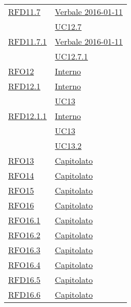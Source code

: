 \begin{longtable}{|>{\centering}m{5cm}|m{5cm}<{\centering}|}
\hyperlink{RFD11.7}{RFD11.7} & \hyperlink{Verbale 2016-01-11}{Verbale 2016-01-11}\\
& \hyperref[UC12.7]{UC12.7}\\ \hline

\hyperlink{RFD11.7.1}{RFD11.7.1} & \hyperlink{Verbale 2016-01-11}{Verbale 2016-01-11}\\
& \hyperref[UC12.7.1]{UC12.7.1}\\ \hline

\hyperlink{RFO12}{RFO12} & \hyperlink{Interno}{Interno}\\ \hline

\hyperlink{RFD12.1}{RFD12.1} & \hyperlink{Interno}{Interno}\\
& \hyperref[UC13]{UC13}\\ \hline

\hyperlink{RFD12.1.1}{RFD12.1.1} & \hyperlink{Interno}{Interno}\\
& \hyperref[UC13]{UC13}\\
& \hyperref[UC13.2]{UC13.2}\\ \hline

\hyperlink{RFO13}{RFO13} & \hyperlink{Capitolato}{Capitolato}\\ \hline

\hyperlink{RFO14}{RFO14} & \hyperlink{Capitolato}{Capitolato}\\ \hline

\hyperlink{RFO15}{RFO15} & \hyperlink{Capitolato}{Capitolato}\\ \hline

\hyperlink{RFO16}{RFO16} & \hyperlink{Capitolato}{Capitolato}\\ \hline

\hyperlink{RFO16.1}{RFO16.1} & \hyperlink{Capitolato}{Capitolato}\\ \hline

\hyperlink{RFO16.2}{RFO16.2} & \hyperlink{Capitolato}{Capitolato}\\ \hline

\hyperlink{RFO16.3}{RFO16.3} & \hyperlink{Capitolato}{Capitolato}\\ \hline

\hyperlink{RFO16.4}{RFO16.4} & \hyperlink{Capitolato}{Capitolato}\\ \hline

\hyperlink{RFD16.5}{RFD16.5} & \hyperlink{Capitolato}{Capitolato}\\ \hline

\hyperlink{RFD16.6}{RFD16.6} & \hyperlink{Capitolato}{Capitolato}\\ \hline


\end{longtable}
